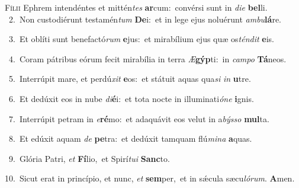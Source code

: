 \lettrine{\initial\textcolor{\initialcolor}{F}}{ílii} Ephrem intendéntes et mittén\textit{tes} \textbf{ar}\-cum:~\star convérsi sunt in \textit{di}\-\textit{e} \textbf{bel}\-li.\\
{\numbfont\textcolor{\numbcolor}{~2.}}~Non custodiérunt testamén\textit{tum} \textbf{De}\-i:~\star et in lege ejus noluérunt \textit{am}\-\textit{bu}\textbf{lá}re.\par
{\numbfont\textcolor{\numbcolor}{~3.}}~Et oblíti sunt benefactó\textit{rum} \textbf{e}\-jus:~\star et mirabílium ejus quæ os\-\textit{tén}\-\textit{dit} \textbf{e}\-is.\par
{\numbfont\textcolor{\numbcolor}{~4.}}~Coram pátribus eórum fecit mirabília in terra \textit{Æ}\-\textbf{gýp}ti:~\star in \textit{cam}\-\textit{po} \textbf{Tá}\-neos.\par
{\numbfont\textcolor{\numbcolor}{~5.}}~Interrúpit mare, et perdú\textit{xit} \textbf{e}\-os:~\star et státuit aquas qua\textit{si} \textit{in} \textbf{u}\-tre.\par
{\numbfont\textcolor{\numbcolor}{~6.}}~Et dedúxit eos in nube \textit{di}\-\textbf{é}i:~\star et tota nocte in illuminati\-\textit{ó}\-\textit{ne} \textbf{i}\-gnis.\par
{\numbfont\textcolor{\numbcolor}{~7.}}~Interrúpit petram in \textit{e}\-\textbf{ré}mo:~\star et adaquávit eos velut in a\-\textit{býs}\-\textit{so} \textbf{mul}\-ta.\par
{\numbfont\textcolor{\numbcolor}{~8.}}~Et edúxit aquam \textit{de} \textbf{pe}\-tra:~\star et dedúxit tamquam flú\-\textit{mi}\-\textit{na} \textbf{a}\-quas.\par
{\numbfont\textcolor{\numbcolor}{~9.}}~Glória Patri, \textit{et} \textbf{Fí}\-lio,~\star et Spirí\-\textit{tu}\-\textit{i} \textbf{Sanc}\-to.\par
{\numbfont\textcolor{\numbcolor}{10.}}~Sicut erat in princípio, et nunc, \textit{et} \textbf{sem}\-per,~\star et in sǽcula sæcu\-\textit{ló}\-\textit{rum}. \textbf{A}\-men.\par

